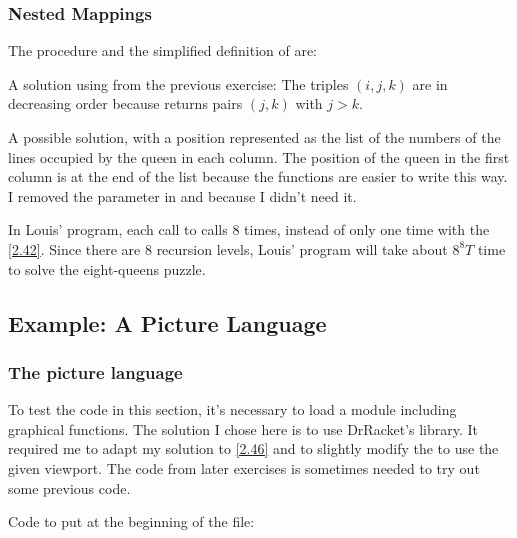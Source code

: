 \subsubsection{Nested Mappings}

\begin{exe}[2.40]
    The procedure  and the simplified definition of 
     are:
\end{exe}

\begin{exe}[2.41]
    A solution using  from the previous exercise:
    The triples $(i, j, k)$ are in decreasing order because  
    returns pairs $(j, k)$ with $j > k$.
\end{exe}

\begin{exe}[2.42]
    \label{2.42}
    A possible solution, with a position represented as the list of the numbers 
    of the lines occupied by the queen in each column. The position of the queen 
    in the first column is at the end of the list because the functions are 
    easier to write this way. I removed the  parameter in  
    and  because I didn’t need it.
\end{exe}

\begin{exe}[2.43]
    In Louis’ program, each call to  calls 
     8 times, instead of only one time with the 
    \autoref{2.42}. Since there are 8 recursion levels, Louis’ program will take 
    about $8^8T$ time to solve the eight-queens puzzle.
\end{exe}

\subsection{Example: A Picture Language}

\subsubsection{The picture language}

\begin{comp}
    To test the code in this section, it’s necessary to load a module including 
    graphical functions. The solution I chose here is to use DrRacket’s 
     library. It required me to adapt my solution to 
    \autoref{2.46} and to slightly modify the  to use 
    the given viewport. The code from later exercises is sometimes needed to try 
    out some previous code.

    Code to put at the beginning of the file:
\end{comp}

